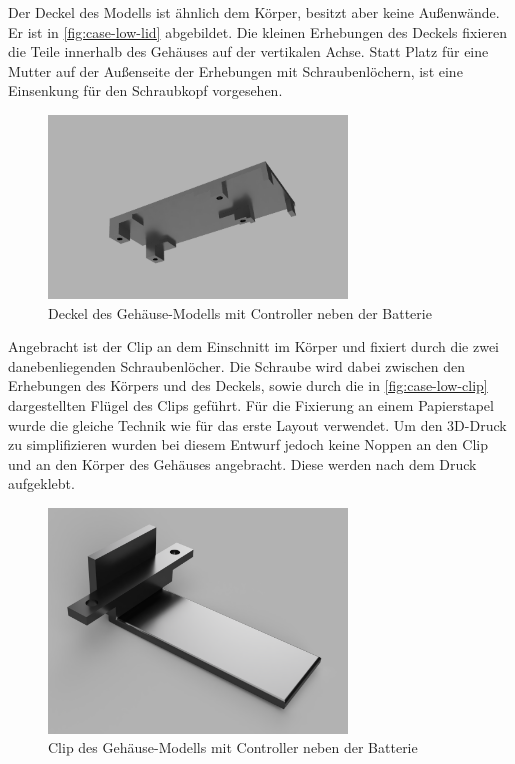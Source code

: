 Der Deckel des Modells ist ähnlich dem Körper, besitzt aber keine Außenwände.
Er ist in \autoref{fig:case-low-lid} abgebildet.
Die kleinen Erhebungen des Deckels fixieren die Teile innerhalb des Gehäuses auf der vertikalen Achse.
Statt Platz für eine Mutter auf der Außenseite der Erhebungen mit Schraubenlöchern, ist eine Einsenkung für den Schraubkopf vorgesehen.

\begin{figure}[htbp]
	\includegraphics[width=300px]{images/case/low_lid.png}
	\centering
	\caption{Deckel des Gehäuse-Modells mit Controller neben der Batterie}
	\label{fig:case-low-lid}
\end{figure}

Angebracht ist der Clip an dem Einschnitt im Körper und fixiert durch die zwei danebenliegenden Schraubenlöcher.
Die Schraube wird dabei zwischen den Erhebungen des Körpers und des Deckels, sowie durch die in
\autoref{fig:case-low-clip} dargestellten Flügel des Clips geführt.
Für die Fixierung an einem Papierstapel wurde die gleiche Technik wie für das erste Layout verwendet.
Um den 3D-Druck zu simplifizieren wurden bei diesem Entwurf jedoch keine Noppen an den Clip und an
den Körper des Gehäuses angebracht. Diese werden nach dem Druck aufgeklebt.

\begin{figure}[htbp]
	\includegraphics[width=300px]{images/case/low_clip.png}
	\centering
	\caption{Clip des Gehäuse-Modells mit Controller neben der Batterie}
	\label{fig:case-low-clip}
\end{figure}

